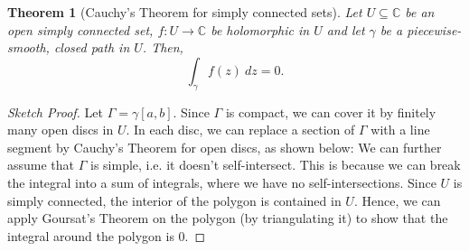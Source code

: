 \documentclass[a4paper, openany]{memoir}
\theoremstyle{definition}
\theoremstyle{plain}
\newtheorem{theorem}[definition]{Theorem}
\begin{document}
    \begin{theorem}[Cauchy's Theorem for simply connected sets]
        Let $U \subseteq \mathbb{C}$ be an open simply connected set, $f \colon U \to \mathbb{C}$ be holomorphic in $U$ and let $\gamma$ be a piecewise-smooth, closed path in $U$. Then,
        \[\int_\gamma f(z) \ dz = 0.\]
    \end{theorem}
    \begin{proof}[Sketch Proof]
        Let $\Gamma = \gamma [a, b]$. Since $\Gamma$ is compact, we can cover it by finitely many open discs in $U$. In each disc, we can replace a section of $\Gamma$ with a line segment by Cauchy's Theorem for open discs, as shown below:
        We can further assume that $\Gamma$ is simple, i.e. it doesn't self-intersect. This is because we can break the integral into a sum of integrals, where we have no self-intersections. Since $U$ is simply connected, the interior of the polygon is contained in $U$. Hence, we can apply Goursat's Theorem on the polygon (by triangulating it) to show that the integral around the polygon is 0.
    \end{proof}
\end{document}
